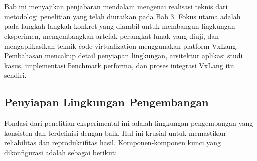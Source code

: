 \chapter{\babEmpat}
Bab ini menyajikan penjabaran mendalam mengenai realisasi teknis dari metodologi penelitian yang telah diuraikan pada Bab 3. Fokus utama adalah pada langkah-langkah konkret yang diambil untuk membangun lingkungan eksperimen, mengembangkan artefak perangkat lunak yang diuji, dan mengaplikasikan teknik \f{code virtualization} menggunakan platform VxLang. Pembahasan mencakup detail penyiapan lingkungan, arsitektur aplikasi studi kasus, implementasi \f{benchmark} performa, dan proses integrasi VxLang itu sendiri.

\section{Penyiapan Lingkungan Pengembangan}
Fondasi dari penelitian eksperimental ini adalah lingkungan pengembangan yang konsisten dan terdefinisi dengan baik. Hal ini krusial untuk memastikan reliabilitas dan reproduktifitas hasil. Komponen-komponen kunci yang dikonfigurasi adalah sebagai berikut:

